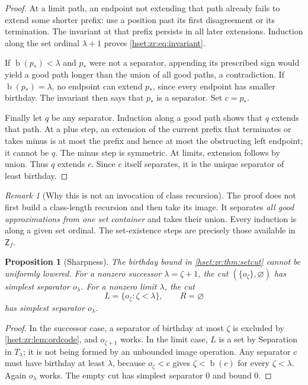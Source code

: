 \documentclass[11pt,letterpaper]{article}
\newtheorem{proposition}[proposition]{Proposition}\aliascntresetthe{proposition}
\theoremstyle{definition}
\theoremstyle{remark}
\newtheorem{remark}[remark]{Remark}\aliascntresetthe{remark}
\newcommand{\bd}{\operatorname{b}}
\newcommand{\Zf}{\mathsf{Z}_{\!f}}
\begin{document}
\begin{proof}
At a limit path, an endpoint not extending that path already fails to extend some shorter prefix: use a position past its first disagreement or its termination. The invariant at that prefix persists in all later extensions. Induction along the set ordinal $\lambda+1$ proves \eqref{hset:zr:eq:invariant}.

If $\bd(p_*)<\lambda$ and $p_*$ were not a separator, appending its prescribed sign would yield a good path longer than the union of all good paths, a contradiction. If $\bd(p_*)=\lambda$, no endpoint can extend $p_*$, since every endpoint has smaller birthday. The invariant then says that $p_*$ is a separator. Set $c=p_*$.

Finally let $q$ be any separator. Induction along a good path shows that $q$ extends that path. At a plus step, an extension of the current prefix that terminates or takes minus is at most the prefix and hence at most the obstructing left endpoint; it cannot be $q$. The minus step is symmetric. At limits, extension follows by union. Thus $q$ extends $c$. Since $c$ itself separates, it is the unique separator of least birthday.
\end{proof}

\begin{remark}[Why this is not an invocation of class recursion]
The proof does not first build a class-length recursion and then take its image. It separates \emph{all good approximations from one set container} and takes their union. Every induction is along a given set ordinal. The set-existence steps are precisely those available in $\Zf$.
\end{remark}

\begin{proposition}[Sharpness]
\label{hset:zr:prop:sharp}
The birthday bound in \cref{hset:zr:thm:setcut} cannot be uniformly lowered. For a nonzero successor $\lambda=\zeta+1$, the cut $(\{o_\zeta\},\varnothing)$ has simplest separator $o_\lambda$. For a nonzero limit $\lambda$, the cut
\[
L=\{o_\zeta:\zeta<\lambda\},\qquad R=\varnothing
\]
has simplest separator $o_\lambda$.
\end{proposition}
\begin{proof}
In the successor case, a separator of birthday at most $\zeta$ is excluded by \cref{hset:zr:lem:ordcode}, and $o_{\zeta+1}$ works. In the limit case, $L$ is a set by Separation in $T_\lambda$; it is not being formed by an unbounded image operation. Any separator $c$ must have birthday at least $\lambda$, because $o_\zeta<c$ gives $\zeta<\bd(c)$ for every $\zeta<\lambda$. Again $o_\lambda$ works. The empty cut has simplest separator $0$ and bound $0$.
\end{proof}
\end{document}
